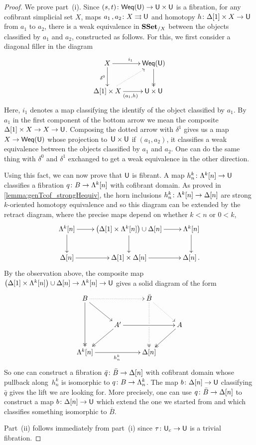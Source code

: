 \documentclass[reqno,10pt,a4paper,oneside,draft]{amsart}
\begin{document}
\begin{proof} We prove part~(i). Since
$(s, t) \colon \mathsf{Weq}(\mathsf{U}) \rightarrow \mathsf{U} \times \mathsf{U}$ is a fibration, for any cofibrant 
simplicial set $X$,  maps $a_1 \, , a_2 \colon X \rightrightarrows \mathsf{U}$ and homotopy $h \colon \Delta[1] \times X \rightarrow \mathsf{U}$ from $a_1$ to $a_2$, there is a weak equivalence in $\mathbf{SSet}_{/X}$ between the objects classified by $a_1$ and $a_2$, constructed as follows. For this, we first consider a diagonal filler in the
diagram
\[
\xymatrix{ X \ar[r]^{i_1} \ar[d]_{\delta^0} & \mathsf{Weq}(\U) \ar@{->>}[d] \\
\Delta[1] \times X \ar[r]_{(a_1,h)} \ar@{.>}[ur] & \U \times \U
}
\]
Here, $i_1$ denotes a map classifying the identify of the object classified by $a_1$. By $a_1$ in the first component of the bottom arrow we mean the composite $\Delta[1] \times X \rightarrow X \rightarrow \mathsf{U}$. Composing the dotted arrow with $\delta^1$ gives us a map $X \rightarrow  \mathsf{Weq}(\mathsf{U})$ whose projection to~$\mathsf{U} \times \mathsf{U}$ if $(a_1,a_2)$, \ie it classifies a weak equivalence between the objects classified by $a_1$ and $a_2$. One can do the same thing with $\delta^0$ and $\delta^1$ exchanged to get a weak equivalence in the other direction.

Using this fact, we can now prove that $\mathsf{U}$ is fibrant. A map $h^k_n \colon \Lambda^k[n] \rightarrow \mathsf{U} $ classifies a fibration $q \colon B \rightarrow \Lambda^k[n]$ with cofibrant domain. As proved in \cref{lemma:genTcof_strongHequiv}, the horn inclusions $h^k_n \colon \Lambda^k [n] \rightarrow \Delta[n]$ are strong $k$-oriented homotopy equivalence and so this diagram can be extended by the retract diagram, where the precise maps depend on whether $k<n$ or $0 < k$,
\[
\xymatrix{\Lambda^k[n] \ar[d] \ar[r] & \big( \Delta[1] \times \Lambda^k[n] \big) \cup \Delta[n] \ar[d] \ar[r] & \Lambda^k[n] \ar[d]  \\
\Delta[n] \ar[r] & \Delta[1] \times \Delta[n] \ar[r] & \Delta[n] \, .
}\]
By the observation above, the composite map $\big( \Delta[1] \times \Lambda^k[n]  \big) \cup \Delta[n] \rightarrow \Lambda^k[n] \to \mathsf{U}$  gives a solid diagram of the form
\[ 
\xymatrix{
  B
  \ar@{.>}[rr]
  \ar[dr]
  \ar@{->>}[dd]
&&
  \bar{B}
  \ar@{.>}[dr]
  \ar@{.>>}[dd]|{\hole}
&\\&
  A'
  \ar[rr]
  \ar@{->>}[dl]
&&
  A
  \ar@{->>}[dl]
\\
  \Lambda^k[n]
  \ar[rr]_{h^k_n}
&&
  \Delta[n]
&
}
\] 
So one can construct a fibration  $\bar{q} \colon \bar{B} \to \Delta[n]$ with cofibrant domain whose pullback 
along~$h^k_n$ is isomorphic to $q \colon B \to \Lambda^k_n$. The map $b \colon \Delta[n] \rightarrow \mathsf{U}$ classifying $\bar{q}$ gives the lift we are looking for. More precisely, one can use $q  \colon \bar{B} \to
\Delta[n]$ to construct  a map $b \colon \Delta[n] \rightarrow \mathsf{U}$ which extend the one we started from and which classifies something isomorphic to $\bar{B}$.

Part~(ii) follows immediately from part~(i) since $\tau \colon \mathsf{U}_c \to \mathsf{U}$ is a trivial fibration.
\end{proof}
\end{document}
